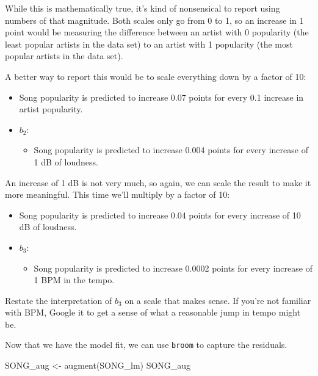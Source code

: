 \documentclass[
]{book}
\newenvironment{Shaded}{\begin{snugshade}}{\end{snugshade}}
\newcommand{\FunctionTok}[1]{\textcolor[rgb]{0.00,0.00,0.00}{#1}}
\newcommand{\NormalTok}[1]{#1}
\newcommand{\OtherTok}[1]{\textcolor[rgb]{0.56,0.35,0.01}{#1}}
\providecommand{\tightlist}{%
  \setlength{\itemsep}{0pt}\setlength{\parskip}{0pt}}
\begin{document}
While this is mathematically true, it's kind of nonsensical to report using numbers of that magnitude. Both scales only go from 0 to 1, so an increase in 1 point would be measuring the difference between an artist with 0 popularity (the least popular artists in the data set) to an artist with 1 popularity (the most popular artists in the data set).

A better way to report this would be to scale everything down by a factor of 10:

\begin{itemize}
\item
  Song popularity is predicted to increase 0.07 points for every 0.1 increase in artist popularity.
\item
  \(b_{2}\):

  \begin{itemize}
  \tightlist
  \item
    Song popularity is predicted to increase 0.004 points for every increase of 1 dB of loudness.
  \end{itemize}
\end{itemize}

An increase of 1 dB is not very much, so again, we can scale the result to make it more meaningful. This time we'll multiply by a factor of 10:

\begin{itemize}
\item
  Song popularity is predicted to increase 0.04 points for every increase of 10 dB of loudness.
\item
  \(b_{3}\):

  \begin{itemize}
  \tightlist
  \item
    Song popularity is predicted to increase 0.0002 points for every increase of 1 BPM in the tempo.
  \end{itemize}
\end{itemize}

Restate the interpretation of \(b_{3}\) on a scale that makes sense. If you're not familiar with BPM, Google it to get a sense of what a reasonable jump in tempo might be.

Now that we have the model fit, we can use \texttt{broom} to capture the residuals.

\begin{Shaded}
\begin{Highlighting}[]
\NormalTok{SONG\_aug }\OtherTok{\textless{}{-}} \FunctionTok{augment}\NormalTok{(SONG\_lm)}
\NormalTok{SONG\_aug}
\end{Highlighting}
\end{Shaded}
\end{document}
